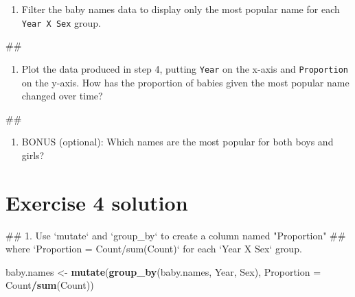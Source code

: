 \documentclass[]{book}
\newenvironment{Shaded}{\begin{snugshade}}{\end{snugshade}}
\newcommand{\KeywordTok}[1]{\textcolor[rgb]{0.13,0.29,0.53}{\textbf{#1}}}
\newcommand{\DataTypeTok}[1]{\textcolor[rgb]{0.13,0.29,0.53}{#1}}
\newcommand{\StringTok}[1]{\textcolor[rgb]{0.31,0.60,0.02}{#1}}
\newcommand{\OperatorTok}[1]{\textcolor[rgb]{0.81,0.36,0.00}{\textbf{#1}}}
\newcommand{\NormalTok}[1]{#1}
\providecommand{\tightlist}{%
  \setlength{\itemsep}{0pt}\setlength{\parskip}{0pt}}
\begin{document}
\begin{enumerate}
\def\labelenumi{\arabic{enumi}.}
\setcounter{enumi}{2}
\tightlist
\item
  Filter the baby names data to display only the most popular name for
  each \texttt{Year\ X\ Sex} group.
\end{enumerate}

\begin{Shaded}
\begin{Highlighting}[]
\NormalTok{##}
\end{Highlighting}
\end{Shaded}

\begin{enumerate}
\def\labelenumi{\arabic{enumi}.}
\setcounter{enumi}{3}
\tightlist
\item
  Plot the data produced in step 4, putting \texttt{Year} on the x-axis
  and \texttt{Proportion} on the y-axis. How has the proportion of
  babies given the most popular name changed over time?
\end{enumerate}

\begin{Shaded}
\begin{Highlighting}[]
\NormalTok{##}
\end{Highlighting}
\end{Shaded}

\begin{enumerate}
\def\labelenumi{\arabic{enumi}.}
\setcounter{enumi}{4}
\tightlist
\item
  BONUS (optional): Which names are the most popular for both boys and
  girls?
\end{enumerate}

\section{Exercise 4 solution}\label{exercise-4-solution}

\begin{Shaded}
\begin{Highlighting}[]
\NormalTok{## 1.  Use `mutate` and `group_by` to create a column named "Proportion"}
\NormalTok{##     where `Proportion = Count/sum(Count)` for each `Year X Sex` group.}
\end{Highlighting}
\end{Shaded}

\begin{Shaded}
\begin{Highlighting}[]
\NormalTok{baby.names <-}\StringTok{ }\KeywordTok{mutate}\NormalTok{(}\KeywordTok{group_by}\NormalTok{(baby.names, Year, Sex),}
                     \DataTypeTok{Proportion =}\NormalTok{ Count}\OperatorTok{/}\KeywordTok{sum}\NormalTok{(Count))}
\end{Highlighting}
\end{Shaded}
\end{document}
